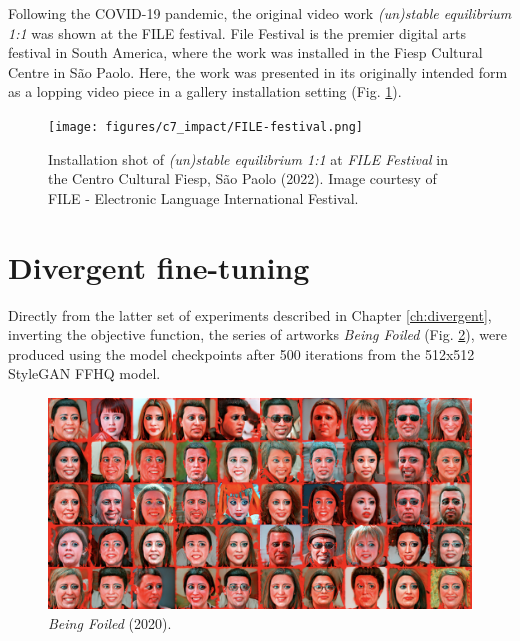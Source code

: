 Following the COVID-19 pandemic, the original video work \textit{(un)stable equilibrium 1:1} was shown at the FILE festival. 
File Festival is the premier digital arts festival in South America, where the work was installed in the Fiesp Cultural Centre in São Paolo. 
Here, the work was presented in its originally intended form as a lopping video piece in a gallery installation setting  (Fig. \ref{fig:c7:file-festival}).

\begin{figure}[!htb]
    \centering
    \captionsetup{justification=centering}
    \texttt{[image: figures/c7\_impact/FILE-festival.png]}
    \caption[Installation shot of \textit{(un)stable equilibrium} at FILE festival]{Installation shot of \textit{(un)stable equilibrium 1:1} at \textit{FILE Festival} in the Centro Cultural Fiesp, São Paolo (2022). Image courtesy of FILE - Electronic Language International Festival.}
    \label{fig:c7:file-festival}
\end{figure}

\section{Divergent fine-tuning}
\label{c7:sec:divergent}


Directly from the latter set of experiments described in Chapter \ref{ch:divergent}, inverting the objective function, the series of artworks \textit{Being Foiled}  (Fig. \ref{fig:c7:being-foiled}), were produced using the model checkpoints after 500 iterations from the 512x512 StyleGAN FFHQ model. 

\begin{figure}[!htb]
    \centering
    \captionsetup{justification=centering}
    \includegraphics[width=1\textwidth]{figures/c7_impact/being-foiled.png}
    \caption{\textit{Being Foiled} (2020).}
    \label{fig:c7:being-foiled}
\end{figure}

